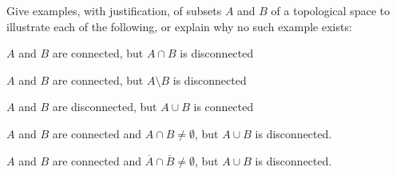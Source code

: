 \begin{comment}

\ExerciseSolution We know that all single point sets are connected. We will show that a subset $A$ of $\R$ with the finite complement topology is connected if and only if $A$ is a single point set or an infinite set. 

First we demonstrate that every finite subset of $\R$ with two or more points is disconnected under the finite complement topology. Let $A$ be a finite subset of $\R$ containing at least two points $a$ and $b$. Let $U = \R \setminus \{a\}$ and let $V = \R \setminus (A \setminus \{a\})$. Then $U$ and $V$ are open, $A \subseteq U \cup V$, $U \cap A = (A \setminus \{a\}) \neq \emptyset$, $V \cap A = \{a\} \neq \emptyset$, and $U \cap V \cap A = \emptyset$. Thus there exists a separation $U$ and $V$ of $A$ and $A$ is disconnected. 

Now we prove that every infinite set of $\R$ under the finite complement topology is connected. Let $A$ be an infinite subset of $\R$. Proceed by contradiction and assume that $A$ is disconnected. Thus, there exists a separation $U$ and $V$ of $A$. Since $\R \setminus U$ and $\R \setminus V$ are both finite, $U$ and $V$ each contain all but a finite number of elements of the set $A$.  So $U \cap V$ must contain an infinite number of elements of $A$, which makes $U \cap V \cap A$ nonempty. Thus, $A$ is connected. 

\end{comment}

\item Give examples, with justification, of subsets $A$ and $B$ of a topological space to illustrate each of the following, or explain why no such example exists:
\ba
\item $A$ and $B$ are connected, but $A \cap B$ is disconnected

\item $A$ and $B$ are connected, but $A \setminus B$ is disconnected

\item $A$ and $B$ are disconnected, but $A \cup B$ is connected

\item $A$ and $B$ are connected and $A \cap B \neq \emptyset$, but $A \cup B$ is disconnected.

\item $A$ and $B$ are connected and $\overline{A} \cap \overline{B} \neq \emptyset$, but $A \cup B$ is disconnected.

